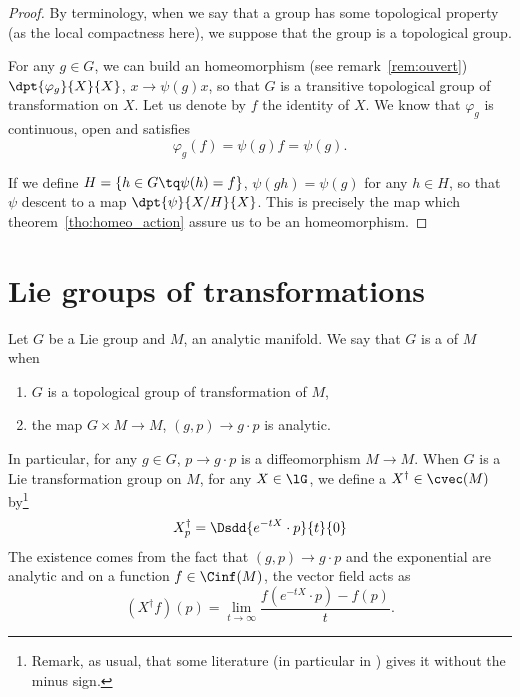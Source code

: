 \begin{proof}
By terminology, when we say that a group has some topological property (as the local compactness here), we suppose that the group is a topological group.

For any $g\in G$, we can build an homeomorphism (see remark~\ref{rem:ouvert}) $\dpt{\varphi_g}{X}{X}$, $x\to \psi(g)x$, so that $G$ is  a transitive topological group of transformation on $X$. Let us denote by $f$ the identity of $X$. We know that $\varphi_g$ is continuous, open and satisfies
\[
   \varphi_g(f)=\psi(g)f=\psi(g).
\]

If we define $H=\{h\in G\tq \psi(h)=f\}$, $\psi(gh)=\psi(g)$ for any $h\in H$, so that $\psi$ descent to a map $\dpt{\psi}{X/H}{X}$. This is precisely the map which theorem~\ref{tho:homeo_action} assure us to be an homeomorphism.

\end{proof}

\section{Lie groups of transformations}

\begin{definition}
Let $G$ be a Lie group and $M$, an analytic manifold. We say that $G$ is a  of $M$ when

\begin{enumerate}
\item $G$ is a topological group of transformation of $M$,
\item the map $G\times M\to M$, $(g,p)\to g\cdot p$ is analytic.
\end{enumerate}
\label{DefLieGpTransfo}
\end{definition}

In particular, for any $g\in G$, $p\to g\cdot p$ is a diffeomorphism $M\to M$. When $G$ is a Lie transformation group on $M$, for any $X\in\lG$, we define a  $X^{\dag}\in\cvec(M)$ by\footnote{Remark, as usual, that some literature (in particular in \cite{Helgason}) gives it without the minus sign.}
\begin{equation}
  X^{\dag}_p=\Dsdd{e^{-tX}\cdot p}{t}{0}
\end{equation}
The existence comes from the fact that $(g,p)\to g\cdot p$ and the exponential are analytic and on a function $f\in\Cinf(M)$, the vector field acts as
\[
   (X^{\dag} f)(p)=\lim_{t\to\infty}\frac{ f(e^{-tX}\cdot p)-f(p) }{t}.
\]

